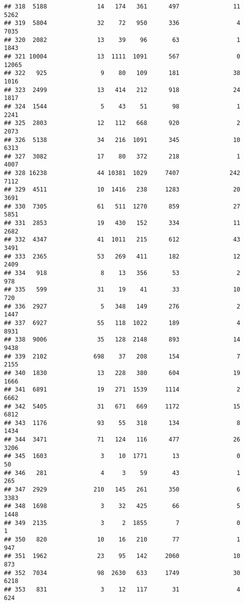 \documentclass[
]{article}
\begin{document}
\begin{verbatim}
## 318  5188              14   174   361      497               11  5262
## 319  5804              32    72   950      336                4  7035
## 320  2082              13    39    96       63                1  1843
## 321 10004              13  1111  1091      567                0 12065
## 322   925               9    80   109      181               38  1016
## 323  2499              13   414   212      918               24  1817
## 324  1544               5    43    51       98                1  2241
## 325  2803              12   112   668      920                2  2073
## 326  5138              34   216  1091      345               10  6313
## 327  3082              17    80   372      218                1  4007
## 328 16238              44 10381  1029     7407              242  7112
## 329  4511              10  1416   238     1283               20  3691
## 330  7305              61   511  1270      859               27  5851
## 331  2853              19   430   152      334               11  2682
## 332  4347              41  1011   215      612               43  3491
## 333  2365              53   269   411      182               12  2409
## 334   918               8    13   356       53                2   978
## 335   599              31    19    41       33               10   720
## 336  2927               5   348   149      276                2  1447
## 337  6927              55   118  1022      189                4  8931
## 338  9006              35   128  2148      893               14  9438
## 339  2102             698    37   208      154                7  2155
## 340  1830              13   228   380      604               19  1666
## 341  6891              19   271  1539     1114                2  6662
## 342  5405              31   671   669     1172               15  6812
## 343  1176              93    55   318      134                8  1434
## 344  3471              71   124   116      477               26  3206
## 345  1603               3    10  1771       13                0    50
## 346   281               4     3    59       43                1   265
## 347  2929             210   145   261      350                6  3383
## 348  1698               3    32   425       66                5  1448
## 349  2135               3     2  1855        7                0     1
## 350   820              10    16   210       77                1   947
## 351  1962              23    95   142     2060               10   873
## 352  7034              98  2630   633     1749               30  6218
## 353   831               3    12   117       31                4   624

\end{verbatim}
\end{document}
